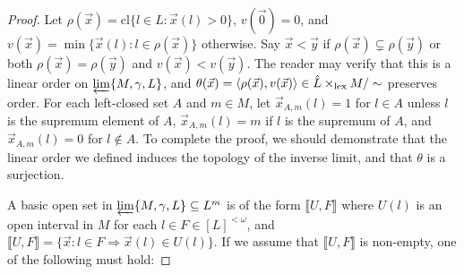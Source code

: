 \documentclass[11pt]{article}
\renewcommand{\cl}{\textrm{cl}}
\newcommand{\lexTimes}{\times_{\textrm{lex}}}
\newcommand{\vect}{\vec}
\newcommand{\lb}{\llbracket}
\newcommand{\rb}{\rrbracket}
\begin{document}
  \begin{proof}
    Let \(\rho(\vect x)=\cl\{l\in L:\vect x(l)>0\}\), \(v(\vect 0)=0\),
    and \(v(\vect x)=\min\{\vect x(l):l\in\rho(\vect x)\}\) otherwise.
    Say \(\vect x<\vect y\) if \(\rho(\vect x)\subsetneq\rho(\vect y)\)
    or both \(\rho(\vect x)=\rho(\vect y)\) and \(v(\vect x)<v(\vect y)\).
    The reader may verify that this is a linear order on
    \(\varprojlim\{M,\gamma,L\}\), and
    \(\theta(\vect x)=\<\rho(\vect x),v(\vect x)\>\in\hat L\lexTimes M/\sim\)
    preserves order.
    For each left-closed set \(A\) and \(m\in M\),
    let \(\vect x_{A,m}(l)=1\) for \(l\in A\) unless \(l\) is the supremum
    element of \(A\),
    \(\vect x_{A,m}(l)=m\) if \(l\) is the supremum of \(A\),
    and \(\vect x_{A,m}(l)=0\) for \(l\not\in A\).
    To complete the proof, we should demonstrate that the linear order we
    defined induces the topology of the inverse limit, and that \(\theta\)
    is a surjection.

    A basic open set in \(\varprojlim\{M,\gamma,L\}\subseteq L^m\)
    is of the form
    \(\lb U,F \rb\) where \(U(l)\) is an open interval in \(M\) for each
    \(l\in F\in [L]^{<\omega}\), and
    \(\lb U,F\rb=\{\vect x:l\in F\Rightarrow\vect x(l)\in U(l)\}\).
    If we assume that \(\lb U,F \rb\) is non-empty, one of the following
    must hold:


\end{proof}
\end{document}
